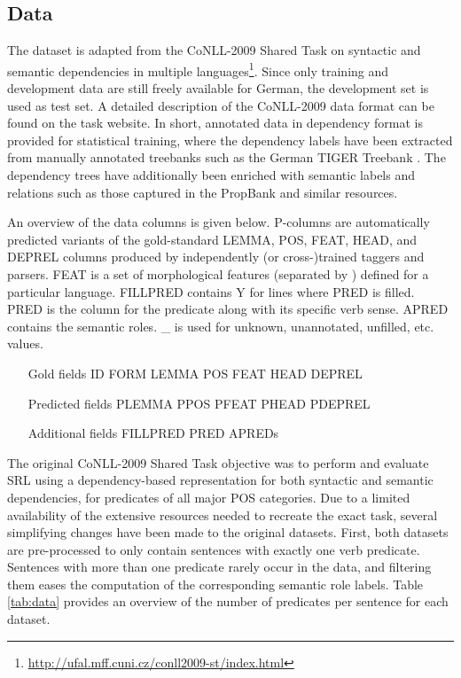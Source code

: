 \documentclass[a4paper,twoside,12pt]{article}
\begin{document}
\subsection{Data}
\label{sub:data}

The dataset is adapted from the CoNLL-2009 Shared Task on syntactic and semantic dependencies in multiple languages\footnote{\url{http://ufal.mff.cuni.cz/conll2009-st/index.html}}. Since only training and development data are still freely available for German, 
the development set is used as test set. A detailed description of the CoNLL-2009 data format can be found on the task website. In short, annotated data in dependency format is provided for statistical training, where the dependency labels have been extracted from manually annotated treebanks such as the German TIGER Treebank \citep{tiger}. The dependency trees have additionally been enriched with semantic labels and relations such as those captured in the PropBank and similar resources. 

An overview of the data columns is given below. P-columns are automatically predicted variants of the gold-standard LEMMA, POS, FEAT, HEAD, and DEPREL columns produced by independently (or cross-)trained taggers and parsers. FEAT is a set of morphological features (separated by \textbar) defined for a particular language. FILLPRED contains Y for lines where PRED is filled. PRED is the column for the predicate along with its specific verb sense. APRED contains the semantic roles. {\ttfamily \_} is used for unknown, unannotated, unfilled, etc. values.\vspace{5pt}

\begin{center}
\begin{varwidth}{\textwidth}
\begin{enumerate}
\item[Gold fields] ID FORM LEMMA  POS  FEAT HEAD DEPREL 
\item[Predicted fields] PLEMMA PPOS PFEAT PHEAD PDEPREL 
\item[Additional fields] FILLPRED PRED APREDs
\end{enumerate}
\end{varwidth}
\end{center}\vspace{5pt}

\noindent
The original CoNLL-2009 Shared Task objective was to perform and evaluate SRL using a dependency-based representation for both syntactic and semantic dependencies, for predicates of all major POS categories. Due to a limited availability of the extensive resources needed to recreate the exact task, several simplifying changes have been made to the original datasets. First, both datasets are pre-processed to only contain sentences with exactly one verb predicate. Sentences with more than one predicate rarely occur in the data, and filtering them eases the computation of the corresponding semantic role labels. Table \ref{tab:data} provides an overview of the number of predicates per sentence for each dataset.
\end{document}
